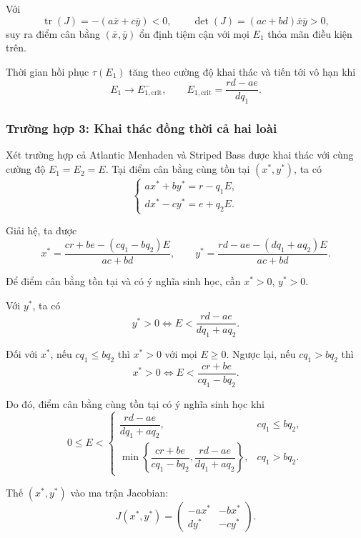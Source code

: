 Với
\[
    \operatorname{tr}(J)=-(a\bar{x}+c\bar{y})<0,
    \qquad
    \det(J)=(ac+bd)\bar{x}\bar{y}>0,
\]
suy ra điểm cân bằng $(\bar{x},\bar{y})$ ổn định
tiệm cận với mọi $E_1$ thỏa mãn điều kiện trên.

Thời gian hồi phục $\tau(E_1)$ tăng theo cường độ
khai thác và tiến tới vô hạn khi
\[
    E_1\to E_{1,\mathrm{crit}}^-,
    \qquad
    E_{1,\mathrm{crit}}=\frac{rd-ae}{dq_1}.
\]



\subsubsection{Trường hợp 3: Khai thác đồng thời cả hai loài}

Xét trường hợp cả Atlantic Menhaden và Striped Bass
được khai thác với cùng cường độ $E_1=E_2=E$.
Tại điểm cân bằng cùng tồn tại $(x^*,y^*)$, ta có
\[
    \begin{cases}
        ax^*+by^*=r-q_1E,\\
        dx^*-cy^*=e+q_2E.
    \end{cases}
\]

Giải hệ, ta được
\[
    x^*=\frac{cr+be-(cq_1-bq_2)E}{ac+bd},
    \qquad
    y^*=\frac{rd-ae-(dq_1+aq_2)E}{ac+bd}.
\]

Để điểm cân bằng tồn tại và có ý nghĩa sinh học,
cần $x^*>0$, $y^*>0$.

Với $y^*$, ta có
\[
    y^*>0
    \Longleftrightarrow
    E<\frac{rd-ae}{dq_1+aq_2}.
\]

Đối với $x^*$, nếu $cq_1\leq bq_2$ thì
$x^*>0$ với mọi $E\geq0$. Ngược lại, nếu
$cq_1>bq_2$ thì
\[
    x^*>0
    \Longleftrightarrow
    E<\frac{cr+be}{cq_1-bq_2}.
\]

Do đó, điểm cân bằng cùng tồn tại có ý nghĩa sinh học khi
\[
    0\leq E<
    \begin{cases}
        \dfrac{rd-ae}{dq_1+aq_2},
        & cq_1\leq bq_2,\\[10pt]
        \min\left\{
            \dfrac{cr+be}{cq_1-bq_2},
            \dfrac{rd-ae}{dq_1+aq_2}
        \right\},
        & cq_1>bq_2.
    \end{cases}
\]

Thế $(x^*,y^*)$ vào ma trận Jacobian:
\[
    J(x^*,y^*)=
    \begin{pmatrix}
        -ax^* & -bx^*\\
        dy^* & -cy^*
    \end{pmatrix}.
\]

